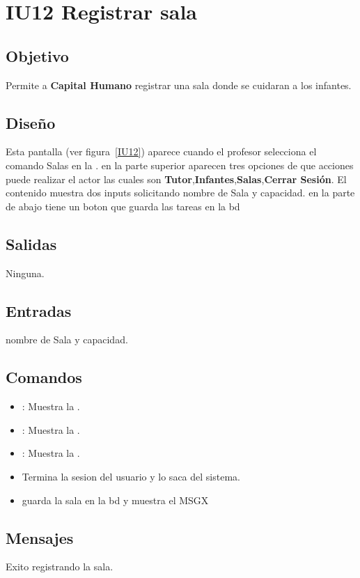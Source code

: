 \newpage
\section{IU12 Registrar sala}

\subsection{Objetivo}
	Permite a {\bf Capital Humano} registrar una sala donde se cuidaran a los infantes.

\subsection{Diseño}
	 Esta pantalla  (ver figura~\ref{IU12}) aparece cuando el            profesor selecciona el comando Salas en la . 
         en la parte superior aparecen tres opciones de que acciones puede realizar el actor las cuales son {\bf Tutor},{\bf Infantes},{\bf Salas},{\bf Cerrar Sesión}. 
         El contenido muestra dos inputs solicitando nombre de Sala y capacidad.
         en la parte de abajo tiene un boton que guarda las tareas en la bd
        
 

\subsection{Salidas}

	Ninguna.

\subsection{Entradas}
nombre de Sala y capacidad.

\subsection{Comandos}
\begin{itemize}
	\item {}: Muestra la .
	\item {}: Muestra la .
 	\item {}: Muestra la .
        \item {}Termina la sesion del usuario y lo saca del sistema.
        \item {} guarda la sala en la bd y muestra el MSGX
\end{itemize}

\subsection{Mensajes}

\begin{Citemize}
	\item Exito registrando la sala.
\end{Citemize}

